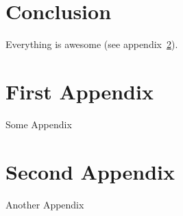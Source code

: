 \documentclass[12pt,a4paper]{article} %
\begin{document}
\newpage
\section{Conclusion}\label{sec:conclusion}
Everything is awesome (see appendix~\ref{sec:first-appendix}).


\newpage
\printbibliography
{}


\newpage
\begin{appendices}
\makeatletter
{}
\makeatother

\section{First Appendix}\label{sec:first-appendix}
Some Appendix

\newpage
\section{Second Appendix}\label{sec:second-appendix}
Another Appendix

\end{appendices}

\end{document}
